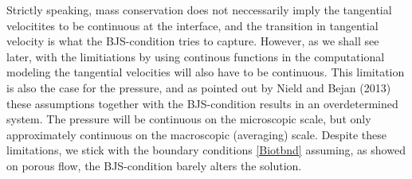 Strictly speaking, mass conservation does not neccessarily imply the tangential velocitites to be continuous at the interface, and the transition in tangential velocity is what the BJS-condition tries to capture. However, as we shall see later, with the limitiations by using continous functions in the computational modeling the tangential velocities will also have to be continuous. This limitation is also the case for the pressure, and as pointed out by Nield and Bejan (2013) \cite{Niel13} these assumptions together with the BJS-condition results in an overdetermined system. The pressure will be continuous on the microscopic scale, but only approximately continuous on the macroscopic (averaging) scale. Despite these limitations, we stick with the boundary conditions \eqref{Biotbnd} assuming, as showed on porous flow, the BJS-condition barely alters the solution. 
